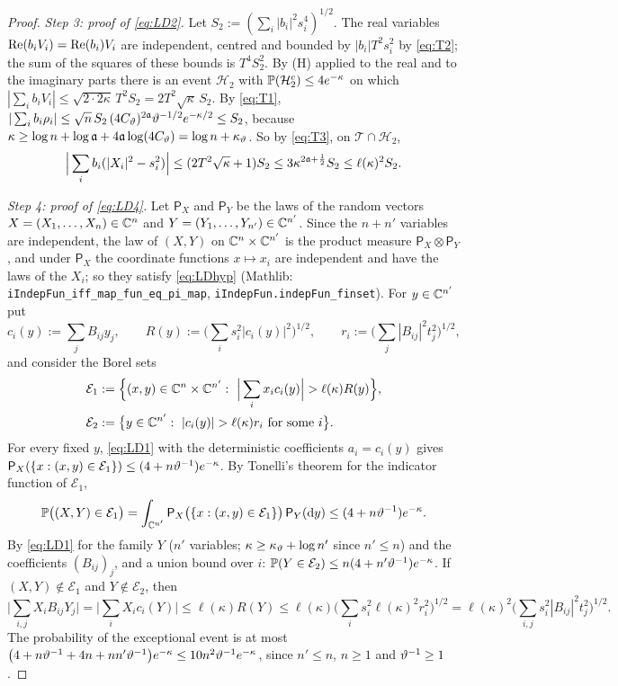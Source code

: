\begin{proof}
\emph{Step 3: proof of \eqref{eq:LD2}.} Let $S_2:=(\sum_i|b_i|^2s_i^4)^{1/2}$. The real variables $\operatorname{Re}(b_iV_i)=\operatorname{Re}(b_i)V_i$ are independent, centred and bounded by $|b_i|T^2s_i^2$ by \eqref{eq:T2}; the sum of the squares of these bounds is $T^4S_2^2$.
By (H) applied to the real and to the imaginary parts there is an event $\mathcal H_2$ with $\mathbb{P}(\mathcal H_2^c)\le4e^{-\kappa}$ on which $|\sum_ib_iV_i|\le\sqrt{2\cdot2\kappa}\,T^2S_2=2T^2\sqrt\kappa\,S_2$.
By \eqref{eq:T1}, $|\sum_ib_i\rho_i|\le\sqrt n\,S_2\,(4C_\vartheta)^{2\mathfrak{a}}\vartheta^{-1/2}e^{-\kappa/2}\le S_2$, because $\kappa\ge\log n+\log\mathfrak{a}+4\mathfrak{a}\log(4C_\vartheta)=\log n+\kappa_\vartheta$. So by \eqref{eq:T3}, on $\mathcal T\cap\mathcal H_2$,
\[
 \Big|\sum_ib_i(|X_i|^2-s_i^2)\Big|\le(2T^2\sqrt\kappa+1)S_2\le3\kappa^{2\mathfrak{a}+\frac12}S_2\le\ell(\kappa)^2S_2 .
\]

\emph{Step 4: proof of \eqref{eq:LD4}.} Let $\mathsf P_X$ and $\mathsf P_Y$ be the laws of the random vectors $X=(X_1,\dots,X_n)\in\mathbb{C}^n$ and $Y=(Y_1,\dots,Y_{n'})\in\mathbb{C}^{n'}$.
Since the $n+n'$ variables are independent, the law of $(X,Y)$ on $\mathbb{C}^n\times\mathbb{C}^{n'}$ is the product measure $\mathsf P_X\otimes\mathsf P_Y$, and under $\mathsf P_X$ the coordinate functions $x\mapsto x_i$ are independent and have the laws of the $X_i$; so
they satisfy \eqref{eq:LDhyp} (Mathlib: \texttt{iIndepFun\_iff\_map\_fun\_eq\_pi\_map}, \texttt{iIndepFun.indepFun\_finset}). For $y\in\mathbb{C}^{n'}$ put
\[
 c_i(y):=\sum_jB_{ij}y_j,\qquad R(y):=\Big(\sum_is_i^2|c_i(y)|^2\Big)^{1/2},\qquad r_i:=\Big(\sum_j|B_{ij}|^2t_j^2\Big)^{1/2},
\]
and consider the Borel sets
\begin{align*}
 \mathcal E_1&:=\Big\{(x,y)\in\C^n\times\C^{n'}:\ \Big|\sum_ix_ic_i(y)\Big|>\ell(\kappa)R(y)\Big\},\\
 \mathcal E_2&:=\big\{y\in\C^{n'}:\ |c_i(y)|>\ell(\kappa)r_i\text{ for some }i\big\}.
\end{align*}
For every fixed $y$, \eqref{eq:LD1} with the deterministic coefficients $a_i=c_i(y)$ gives $\mathsf P_X(\{x:(x,y)\in\mathcal E_1\})\le(4+n\vartheta^{-1})e^{-\kappa}$. By Tonelli's theorem for the indicator function of $\mathcal E_1$,
\[
 \mathbb{P}\big((X,Y)\in\mathcal E_1\big)=\int_{\mathbb{C}^{n'}}\mathsf P_X\big(\{x:(x,y)\in\mathcal E_1\}\big)\,\mathsf P_Y(\mathrm{d} y)\le(4+n\vartheta^{-1})e^{-\kappa}.
\]
By \eqref{eq:LD1} for the family $Y$ ($n'$ variables; $\kappa\ge\kappa_\vartheta+\log n'$ since $n'\le n$) and the coefficients $(B_{ij})_j$, and a union bound over $i$: $\mathbb{P}(Y\in\mathcal E_2)\le n(4+n'\vartheta^{-1})e^{-\kappa}$.
If $(X,Y)\notin\mathcal E_1$ and $Y\notin\mathcal E_2$, then
\[
 \Big|\sum_{i,j}X_iB_{ij}Y_j\Big|=\Big|\sum_iX_ic_i(Y)\Big|\le\ell(\kappa)R(Y)\le\ell(\kappa)\Big(\sum_is_i^2\ell(\kappa)^2r_i^2\Big)^{1/2}=\ell(\kappa)^2\Big(\sum_{i,j}s_i^2|B_{ij}|^2t_j^2\Big)^{1/2}.
\]
The probability of the exceptional event is at most $\big(4+n\vartheta^{-1}+4n+nn'\vartheta^{-1}\big)e^{-\kappa}\le10n^2\vartheta^{-1}e^{-\kappa}$, since $n'\le n$, $n\ge1$ and $\vartheta^{-1}\ge1$.


\end{proof}
